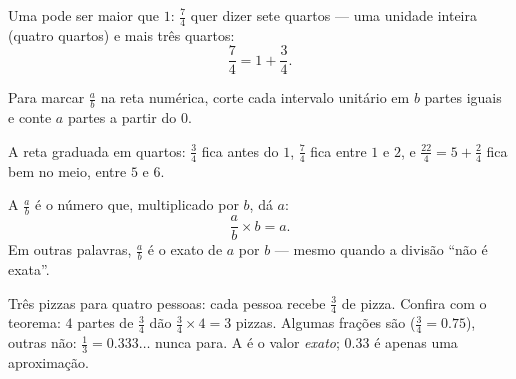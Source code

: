 \begin{example}\label{ex:g6:fractions:morethanone}
Uma  pode ser maior que $1$: $\frac74$ quer dizer sete quartos
--- uma unidade inteira (quatro quartos) e mais três quartos:
\[
\frac74 = 1 + \frac34 .
\]
\end{example}

\begin{proposition}\label{prop:g6:fractions:line}
Para marcar $\frac ab$ na reta numérica, corte cada intervalo unitário
em $b$ partes iguais e conte $a$ partes a partir do $0$.
\end{proposition}

\begin{omfigure}

{\small A reta graduada em quartos: $\frac34$ fica antes do $1$,
$\frac74$ fica entre $1$ e $2$, e $\frac{22}{4} = 5 + \frac24$ fica bem
no meio, entre $5$ e $6$.}
\end{omfigure}

\begin{theorem}\label{thm:g6:fractions:quotient}
A  $\frac ab$ é o número que, multiplicado por $b$, dá $a$:
\[
\frac ab \times b = a .
\]
Em outras palavras, $\frac ab$ é o  exato de $a$ por $b$ ---
mesmo quando a divisão ``não é exata''.
\end{theorem}
\admitted

\begin{example}\label{ex:g6:fractions:pizzas}
Três pizzas para quatro pessoas: cada pessoa recebe $\frac34$ de pizza.
Confira com o teorema: $4$ partes de $\frac34$ dão
$\frac34 \times 4 = 3$ pizzas. Algumas frações são 
($\frac34 = 0.75$), outras não: $\frac13 = 0.333\dots$ nunca para. A
 é o valor \emph{exato}; $0.33$ é apenas uma aproximação.
\end{example}

